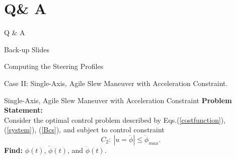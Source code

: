 \documentclass{beamer}
\begin{document}
\section{Q\& A }
\begin{frame}
\begin{block}{}
\begin{center}
\Huge{Q \& A}
\end{center}
\end{block}
\end{frame}
%
\begin{frame}
\begin{block}{}
\begin{center}
\Huge{Back-up Slides}
\end{center}
\end{block}
\end{frame}
\begin{frame}
\begin{block}{}
\begin{center}
{\LARGE{Computing the Steering Profiles}}
\begin{center}
Case II: Single-Axis, Agile Slew Maneuver with Acceleration Constraint.
\end{center}
\end{center}
\end{block}
\end{frame}
\begin{frame}
\begin{block}{ Single-Axis, Agile Slew Maneuver with Acceleration Constraint}
 {\bf Problem Statement:} \\ Consider the optimal control problem described by Eqs.(\ref{costfunction}), (\ref{system}), (\ref{Bcs}), and subject to control constraint
\begin{equation}
C_2: \ |u=\ddot{\phi}|\leq \ddot{\phi}_{max}.
\end{equation}
 {\bf Find:} $\phi(t)$, $\dot{\phi}(t)$, and $\ddot{\phi}(t)$.
 \end{block}
 \end{frame}
\end{document}
